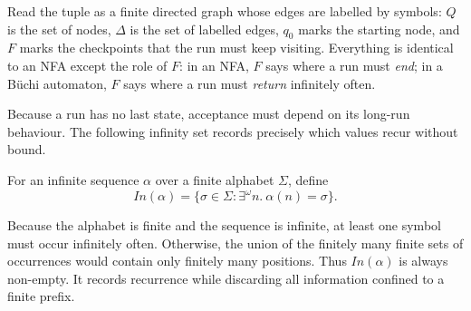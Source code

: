 \begin{definition}
\begin{center}
\vspace{10pt}
\end{center}
\end{definition}

Read the tuple as a finite directed graph whose edges are labelled by
symbols: $Q$ is the set of nodes, $\Delta$ is the set of labelled edges,
$q_0$ marks the starting node, and $F$ marks the checkpoints that the
run must keep visiting.  Everything is identical to an NFA except the
role of $F$: in an NFA, $F$ says where a run must \emph{end}; in a
B\"uchi automaton, $F$ says where a run must \emph{return} infinitely
often.

Because a run has no last state, acceptance must depend on its long-run
behaviour.  The following infinity set records precisely which values recur
without bound.

\begin{definition}
\label{def:inf-set}
For an infinite sequence $\alpha$ over a finite alphabet $\Sigma$, define
\[
  In(\alpha)=\{\sigma\in\Sigma : \exists^\omega n.\ \alpha(n)=\sigma\}.
\]
\end{definition}

Because the alphabet is finite and the sequence is infinite, at least one
symbol must occur infinitely often.  Otherwise, the union of the finitely
many finite sets of occurrences would contain only finitely many positions.
Thus $In(\alpha)$ is always non-empty.  It records recurrence while
discarding all information confined to a finite prefix.

